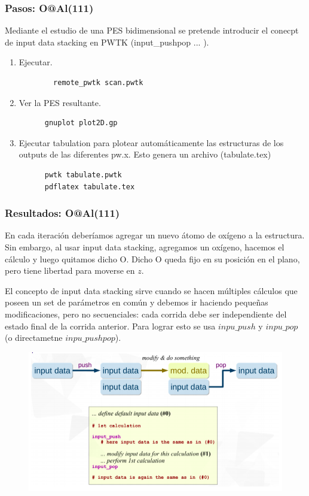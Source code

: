 \subsubsection{Pasos: O@Al(111)}

  Mediante el estudio de una PES bidimensional se pretende introducir el conecpt de input data stacking en PWTK (input\_pushpop { ... }).
  \begin{enumerate}
    \item Ejecutar.
      \begin{verbatim}
        remote_pwtk scan.pwtk
      \end{verbatim}
    \item Ver la PES resultante.
    \begin{verbatim}
      gnuplot plot2D.gp
    \end{verbatim}
    \item Ejecutar tabulation para plotear automáticamente las estructuras de los outputs de las diferentes pw.x. Esto genera un archivo (tabulate.tex)
    \begin{verbatim}
      pwtk tabulate.pwtk
      pdflatex tabulate.tex
    \end{verbatim}
  \end{enumerate}

\subsubsection{Resultados: O@Al(111)}

  En cada iteración deberíamos agregar un nuevo átomo de oxígeno a la estructura. Sin embargo, al usar input data stacking, agregamos un oxígeno, hacemos el cálculo y luego quitamos dicho O. Dicho O queda fijo en su posición en el plano,  pero tiene libertad para moverse en $z$.

  El concepto de input data stacking sirve cuando se hacen múltiples cálculos que poseen un set de parámetros en común y debemos ir haciendo pequeñas modificaciones, pero no secuenciales: cada corrida debe ser independiente del estado final de la corrida anterior. Para lograr esto se usa $inpu\_push$ y $inpu\_pop$ (o directametne $inpu\_pushpop$).

  \begin{figure}[H]
      \centering
      \includegraphics[scale = 0.4]{figs/D3/pushpop.png}
  \end{figure}



